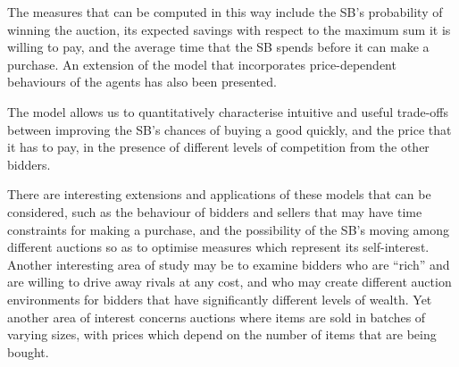 \documentclass{comjnl}
\begin{document}
The measures that can be computed in this way include the SB's
probability of winning the auction, its expected savings with
respect to the maximum sum it is willing to pay, and the average
time that the SB spends before it can make a purchase. An
extension of the model that incorporates price-dependent
behaviours of the agents has also been presented.

The model allows us to quantitatively characterise intuitive and
useful trade-offs between improving the SB's chances of buying a
good quickly, and the price that it has to pay, in the presence of
different levels of competition from the other bidders.


There are interesting extensions and applications of these models
that can be considered, such as the behaviour of bidders and
sellers that may have time constraints for making a purchase, and
the possibility of the SB's moving among different auctions so as
to optimise measures which represent its self-interest. Another
interesting area of study may be to examine bidders who are
``rich'' and are willing to drive away rivals at any cost, and who
may create different auction environments for bidders that have
significantly different levels of wealth. Yet another area of
interest concerns auctions where items are sold in batches of
varying sizes, with prices which depend on the number of items
that are being bought.



\nocite{*}


% 

\end{document}

